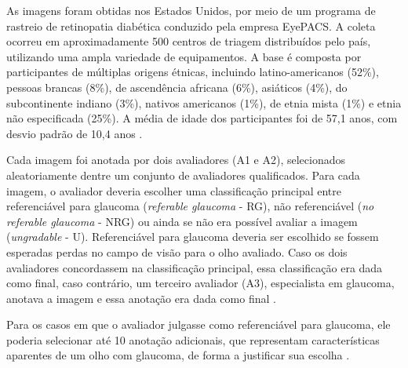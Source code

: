 \documentclass[12pt]{article}
\begin{document}
As imagens foram obtidas nos Estados Unidos, por meio de um programa de rastreio de retinopatia diabética conduzido pela empresa EyePACS. A coleta ocorreu em aproximadamente 500 centros de triagem distribuídos pelo país, utilizando uma ampla variedade de equipamentos.
A base é composta por participantes de múltiplas origens étnicas, incluindo latino-americanos (52\%), pessoas brancas (8\%), de ascendência africana (6\%), asiáticos (4\%), do subcontinente indiano (3\%), nativos americanos (1\%), de etnia mista (1\%) e etnia não especificada (25\%). A média de idade dos participantes foi de 57,1 anos, com desvio padrão de 10,4 anos \cite{justraigs_article}.

Cada imagem foi anotada por dois avaliadores (A1 e A2), selecionados aleatoriamente dentre um conjunto de avaliadores qualificados. 
Para cada imagem, o avaliador deveria escolher uma classificação principal entre referenciável para glaucoma (\emph{referable glaucoma} - RG), não referenciável (\emph{no referable glaucoma} - NRG) ou ainda se não era possível avaliar a imagem (\emph{ungradable} - U). Referenciável para glaucoma deveria ser escolhido se fossem esperadas perdas no campo de visão para o olho avaliado.
Caso os dois avaliadores concordassem na classificação principal, essa classificação era dada como final, caso contrário, um terceiro avaliador (A3), especialista em glaucoma, anotava a imagem e essa anotação era dada como final \cite{justraigs_article}.

Para os casos em que o avaliador julgasse como referenciável para glaucoma, ele poderia selecionar até 10 anotação adicionais, que representam características aparentes de um olho com glaucoma, de forma a justificar sua escolha \cite{justraigs_article}.
\end{document}
